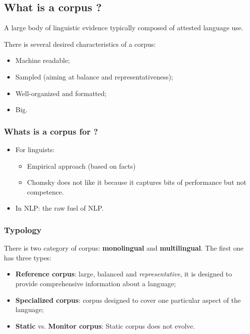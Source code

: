 
\subsection{What is a corpus ?}

A large body of linguistic evidence typically composed of attested language use.

There is several desired characteristics of a corpus:
\begin{itemize}
	\item Machine readable;
	\item Sampled (aiming at balance and representativeness);
	\item Well-organized and formatted;
	\item Big.
\end{itemize}

\subsubsection{Whats is a corpus for ?}

\begin{itemize}
	\item For linguists:
	\begin{itemize}
		\item Empirical approach (based on facts)
		\item Chomsky does not like it because it captures bits of performance but not competence. 
	\end{itemize}
	\item In NLP: the raw fuel of NLP.
\end{itemize}

\subsubsection{Typology}

There is two category of corpus: \textbf{monolingual} and \textbf{multilingual}. The first one has three types:
\begin{itemize}
	\item \textbf{Reference corpus}: large, balanced and \textit{representative}, it is designed to provide comprehensive information about a language;
	\item \textbf{Specialized corpus}: corpus designed to cover one particular aspect of the language;
	\item \textbf{Static} vs. \textbf{Monitor corpus}: Static corpus does not evolve.
\end{itemize}

